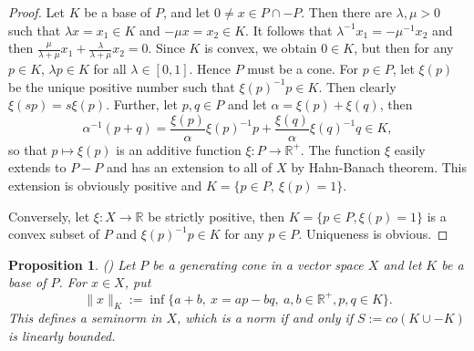 \documentclass[12pt]{article}
\newtheorem{prop}{Proposition}
\theoremstyle{remark}
\newcommand{\<}{\langle}
\begin{document}
\begin{proof} Let $K$ be a base of $P$, and let $0\neq x\in P\cap -P$. Then there are $\lambda,\mu >0$ such that $\lambda x=x_1\in K$ and $-\mu x=x_2\in K$.  
It follows that $\lambda^{-1}x_1=-\mu^{-1}x_2$ and then  $\tfrac{\mu}{\lambda+\mu}x_1+\tfrac{\lambda}{\lambda+\mu}x_2=0$. Since $K$ is convex, we obtain $0\in K$, but then 
 for any $p\in K$,  $\lambda p\in K$ for all $\lambda\in[0,1]$. Hence $P$ must be a cone.  For $p\in P$, let $\xi(p)$ be the unique positive number such that 
$\xi(p)^{-1}p\in K$. Then clearly $\xi(sp)=s\xi(p)$. Further, let $p,q\in P$ and let $\alpha=\xi(p)+\xi(q)$, then 
\[
\alpha^{-1}(p+q)=\frac{\xi(p)}{\alpha} \xi(p)^{-1}p+ \frac{\xi(q)}{\alpha} \xi(q)^{-1}q\in K,
\]
so that  $p\mapsto \xi(p)$ is an additive function  $\xi: P\to \mathbb R^+$. The function $\xi$ easily extends to $P-P$ and has an extension to all of $X$ by Hahn-Banach theorem. This extension is obviously positive and $K=\{p\in P,\ \xi(p)=1\}$.  

Conversely, let $\xi:X\to \mathbb R$ be strictly positive, then $K=\{p\in P, \xi(p)=1\}$ is a convex subset of $P$ and $\xi(p)^{-1}p\in K$ for any $p\in P$. Uniqueness is obvious. 



\end{proof}



\begin{prop} (\cite{ellis}) Let $P$ be a generating cone in a vector space $X$ and let $K$ be a base of $P$. For $x\in X$, put 
\[
\|x\|_K:=\inf\{a+b,\ x=a p-b q,\ a,b\in \mathbb R^+, p,q\in K\}.
\]
This defines a seminorm in $X$, which is a norm if and only if $S:=co(K\cup -K)$ is linearly bounded. 

\end{prop}
\end{document}

